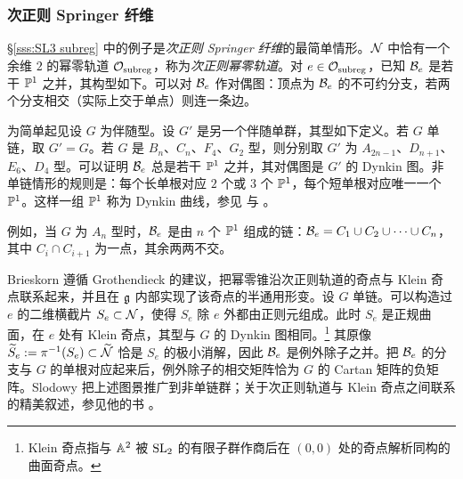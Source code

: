 \subsubsection{次正则 Springer 纤维}\label{sss:subreg} \S\ref{sss:SL3 subreg} 中的例子是{\em 次正则 Springer 纤维}的最简单情形。$\sN$ 中恰有一个余维 $2$ 的幂零轨道 $\calO_{\subreg}$，称为{\em 次正则幂零轨道}。对 $e\in\calO_{\subreg}$，已知 $\sB_{e}$ 是若干 $\PP^{1}$ 之并，其构型如下。可以对 $\sB_{e}$ 作对偶图：顶点为 $\sB_{e}$ 的不可约分支，若两个分支相交（实际上交于单点）则连一条边。

为简单起见设 $G$ 为伴随型。设 $G'$ 是另一个伴随单群，其型如下定义。若 $G$ 单链，取 $G'=G$。若 $G$ 是 $B_{n}$、$C_{n}$、$F_{4}$、$G_{2}$ 型，则分别取 $G'$ 为 $A_{2n-1}$、$D_{n+1}$、$E_{6}$、$D_{4}$ 型。可以证明 $\sB_{e}$ 总是若干 $\PP^{1}$ 之并，其对偶图是 $G'$ 的 Dynkin 图。非单链情形的规则是：每个长单根对应 $2$ 个或 $3$ 个 $\PP^{1}$，每个短单根对应唯一一个 $\PP^{1}$。这样一组 $\PP^{1}$ 称为 Dynkin 曲线，参见 \cite[\S3.10, Definition and Prop 2]{StConj} 与 \cite[\S6.3]{Slodowy}。

例如，当 $G$ 为 $A_{n}$ 型时，$\sB_{e}$ 是由 $n$ 个 $\PP^{1}$ 组成的链：$\sB_{e}=C_{1}\cup C_{2}\cup\cdots\cup C_{n}$，其中 $C_{i}\cap C_{i+1}$ 为一点，其余两两不交。

Brieskorn \cite{Brieskorn} 遵循 Grothendieck 的建议，把幂零锥沿次正则轨道的奇点与 Klein 奇点联系起来，并且在 $\frg$ 内部实现了该奇点的半通用形变。设 $G$ 单链。可以构造过 $e$ 的二维横截片 $S_{e}\subset\sN$，使得 $S_{e}$ 除 $e$ 外都由正则元组成。此时 $S_{e}$ 是正规曲面，在 $e$ 处有 Klein 奇点，其型与 $G$ 的 Dynkin 图相同。\footnote{Klein 奇点指与 $\AA^{2}$ 被 $\SL_{2}$ 的有限子群作商后在 $(0,0)$ 处的奇点解析同构的曲面奇点。} 其原像 $\tilS_{e}:=\pi^{-1}(S_{e})\subset\tN$ 恰是 $S_{e}$ 的极小消解，因此 $\sB_{e}$ 是例外除子之并。把 $\sB_{e}$ 的分支与 $G$ 的单根对应起来后，例外除子的相交矩阵恰为 $G$ 的 Cartan 矩阵的负矩阵。Slodowy \cite{Slodowy} 把上述图景推广到非单链群；关于次正则轨道与 Klein 奇点之间联系的精美叙述，参见他的书 \cite{Slodowy}。
